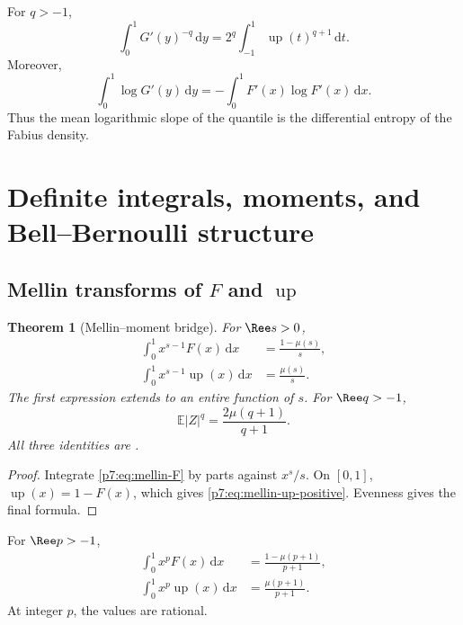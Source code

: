 \documentclass[11pt,oneside]{article}
\newtheorem{theorem}{Theorem}[section]
\theoremstyle{definition}
\theoremstyle{remark}
\newcommand{\Up}{\operatorname{up}}
\newcommand{\E}{\mathbb E}
\newcommand{\dd}{\,\mathrm d}
\newcommand{\1}{\mathbf 1}
\begin{document}
\begin{corollary}
For $q>-1$,
\begin{equation}
 \int_0^1G'(y)^{-q}\dd y
 =2^q\int_{-1}^{1}\Up(t)^{q+1}\dd t.
 \label{p7:eq:inverse-negative-slope}
\end{equation}
Moreover,
\begin{equation}
 \int_0^1\log G'(y)\dd y
 =-\int_0^1F'(x)\log F'(x)\dd x.
 \label{p7:eq:inverse-entropy}
\end{equation}
Thus the mean logarithmic slope of the quantile is the differential entropy of the Fabius
density.
\end{corollary}

\section{Definite integrals, moments, and Bell--Bernoulli structure}
\label{p7:sec:definite}

\subsection{Mellin transforms of $F$ and $\Up$}

\begin{theorem}[Mellin--moment bridge]
\label{p7:thm:mellin-F}
For $\Ree s>0$,
\begin{align}
 \int_0^1x^{s-1}F(x)\dd x
 &=\frac{1-\mu(s)}s,\label{p7:eq:mellin-F}\\
 \int_0^1x^{s-1}\Up(x)\dd x
 &=\frac{\mu(s)}s.\label{p7:eq:mellin-up-positive}
\end{align}
The first expression extends to an entire function of $s$.  For $\Ree q>-1$,
\begin{equation}
 \E|Z|^q=\frac{2\mu(q+1)}{q+1}.
 \label{p7:eq:absolute-Z-moment}
\end{equation}
All three identities are \statusproved.
\end{theorem}

\begin{proof}
Integrate \cref{p7:eq:mellin-F} by parts against $x^s/s$.  On $[0,1]$,
$\Up(x)=1-F(x)$, which gives \cref{p7:eq:mellin-up-positive}.  Evenness gives the final formula.
\end{proof}

\begin{corollary}
For $\Ree p>-1$,
\begin{align}
 \int_0^1x^pF(x)\dd x
 &=\frac{1-\mu(p+1)}{p+1},\label{p7:eq:F-power-definite}\\
 \int_0^1x^p\Up(x)\dd x
 &=\frac{\mu(p+1)}{p+1}.\label{p7:eq:up-power-definite}
\end{align}
At integer $p$, the values are rational.
\end{corollary}
\end{document}
